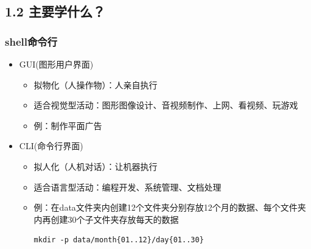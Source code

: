 \documentclass[xcolor=svgnames,presentation]{beamer}
\begin{document}
\subsection{1.2 主要学什么？}
\label{sec-1-2}
\begin{frame}[fragile]
\frametitle{shell命令行}
\label{sec-1-2-1}
\begin{itemize}

\item GUI(图形用户界面)
\label{sec-1-2-1-1}%
\begin{itemize}

\item 拟物化（人操作物）：人亲自执行
\label{sec-1-2-1-1-1}%

\item 适合视觉型活动：图形图像设计、音视频制作、上网、看视频、玩游戏
\label{sec-1-2-1-1-2}%

\item 例：制作平面广告
\label{sec-1-2-1-1-3}%
\end{itemize} %

\item CLI(命令行界面)
\label{sec-1-2-1-2}%
\begin{itemize}

\item 拟人化（人机对话）：让机器执行
\label{sec-1-2-1-2-1}%

\item 适合语言型活动：编程开发、系统管理、文档处理
\label{sec-1-2-1-2-2}%

\item 例：在data文件夹内创建12个文件夹分别存放12个月的数据、每个文件夹内再创建30个子文件夹存放每天的数据\\
\label{sec-1-2-1-2-3}%
\begin{verbatim}
mkdir -p data/month{01..12}/day{01..30}
\end{verbatim}
\end{itemize} %
\end{itemize} %
\end{frame}
\end{document}
